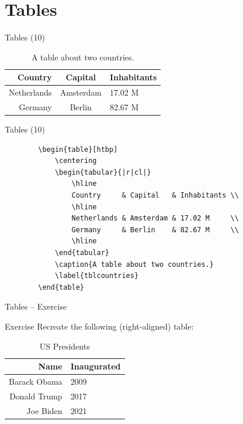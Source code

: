 \documentclass{beamer}
\begin{document}
\section{Tables}

\begin{frame}{Tables (10)}
    \begin{table}[ht]
        \centering
        \begin{tabular}{|r|cl|}
            \hline
            Country     & Capital   & Inhabitants \\
            \hline
            Netherlands & Amsterdam & 17.02 M     \\
            Germany     & Berlin    & 82.67 M     \\
            \hline
        \end{tabular}
        \caption{A table about two countries.}
        \label{tbltables}
    \end{table}
\end{frame}

\begin{frame}[fragile]{Tables (10)}
    \small
    \begin{verbatim}
        \begin{table}[htbp]
            \centering
            \begin{tabular}{|r|cl|}
                \hline
                Country     & Capital   & Inhabitants \\
                \hline
                Netherlands & Amsterdam & 17.02 M     \\
                Germany     & Berlin    & 82.67 M     \\
                \hline
            \end{tabular}
            \caption{A table about two countries.}
            \label{tblcountries}
        \end{table}
        \end{verbatim}
\end{frame}

\begin{frame}{Tables -- Exercise}
    \begin{block}{Exercise}
        Recreate the following (right-aligned) table:
        \begin{table}[ht!]
            \flushright
            \begin{tabular}{r|l}
                \hline
                \textbf{Name} & \textbf{Inaugurated} \\\hline
                Barack Obama  & 2009                 \\
                Donald Trump  & 2017                 \\
                Joe Biden     & 2021                 \\\hline
            \end{tabular}
            \caption{US Presidents}
        \end{table}
    \end{block}
\end{frame}
\end{document}
